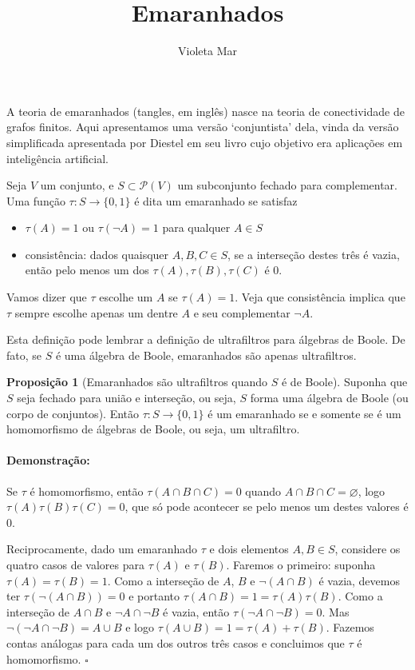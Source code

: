\documentclass[11pt]{article}
\title{Emaranhados}
\author{Violeta Mar}
\date{}
\renewcommand{\textit}[1]{{\fakeitalic#1}}
\newcommand{\pulinho}{\vspace{.5cm}}
\theoremstyle{definition}
\theoremstyle{definition}
\theoremstyle{definition}
\newtheorem{prop}{Proposição}
\newenvironment{proposicao}{
\definecolor{shadecolor}{HTML}{FFDBDF}
\begin{shaded}
\begin{prop}
}
{
\end{prop}
\end{shaded}
}
\theoremstyle{definition}
\theoremstyle{definition}
\theoremstyle{definition}
\theoremstyle{definition}
\theoremstyle{definition}
\newtheorem*{definition*}{Definição}
\newenvironment{definicao*}{
\definecolor{shadecolor}{HTML}{defcfc}
\begin{shaded}
\begin{definition*}
}
{
\end{definition*}
\end{shaded}
}
\theoremstyle{definition}
\theoremstyle{definition}
\theoremstyle{definition}
\theoremstyle{definition}
\newenvironment{prova}{\paragraph{Demonstração:}}{\hfill$\square$ 
\pulinho
}
\theoremstyle{definition}
\begin{document}
\maketitle

A teoria de emaranhados (\textit{tangles}, em inglês) nasce na teoria de conectividade de grafos finitos. Aqui apresentamos uma versão `conjuntista' dela, vinda da versão simplificada apresentada por Diestel em seu livro cujo objetivo era aplicações em inteligência artificial. \cite{diestel2024tangles}

\begin{definicao*}Seja $V$ um conjunto, e $S \subset \mathcal{P}(V)$ um subconjunto fechado para complementar. Uma função $\tau: S \rightarrow \{0,1\}$ é dita um \textit{emaranhado} se satisfaz
  \begin{itemize}[label=]
  \item $\tau(A) = 1$ ou $\tau(\lnot A) = 1$ para qualquer $A \in S$
  \item \textit{consistência}: dados quaisquer $A,B,C \in S$, se a interseção destes três é vazia, então pelo menos um dos $\tau(A),\tau(B), \tau(C)$ é $0$.
  \end{itemize} 
\end{definicao*}

Vamos dizer que $\tau$ escolhe um $A$ se $\tau(A) = 1$. Veja que consistência implica que $\tau$ sempre escolhe apenas um dentre $A$ e seu complementar $\lnot A$.

Esta definição pode lembrar a definição de ultrafiltros para álgebras de Boole. De fato, se $S$ é uma álgebra de Boole, emaranhados são apenas ultrafiltros.

\begin{proposicao}[Emaranhados são ultrafiltros quando $S$ é de Boole]
  Suponha que $S$ seja fechado para união e interseção, ou seja, $S$ forma uma álgebra de Boole (ou corpo de conjuntos). Então $\tau:S \rightarrow \{0,1\}$ é um emaranhado se e somente se é um homomorfismo de álgebras de Boole, ou seja, um ultrafiltro.
\end{proposicao}
\begin{prova}
  Se $\tau$ é homomorfismo, então $\tau(A\cap B \cap C) = 0$ quando $A \cap B \cap C = \varnothing$, logo $\tau(A)\tau(B)\tau(C) = 0$, que só pode acontecer se pelo menos um destes valores é $0$.

  Reciprocamente, dado um emaranhado $\tau$ e dois elementos $A,B \in S$, considere os quatro casos de valores para $\tau(A)$ e $\tau(B)$. Faremos o primeiro: suponha $\tau(A) = \tau(B) = 1$. Como a interseção de $A$, $B$ e $\lnot (A \cap B)$ é vazia, devemos ter $\tau (\lnot (A \cap B)) = 0$ e portanto $\tau(A \cap B) = 1 = \tau(A)\tau(B)$. Como a interseção de $A \cap B$ e $\lnot A \cap \lnot B$ é vazia, então $\tau(\lnot A \cap \lnot B) = 0 $. Mas $\lnot (\lnot A \cap \lnot B) = A \cup B$ e logo $\tau(A \cup B) = 1 = \tau(A) + \tau(B)$. Fazemos contas análogas para cada um dos outros três casos e concluimos que $\tau$ é homomorfismo.
\end{prova}
\end{document}

